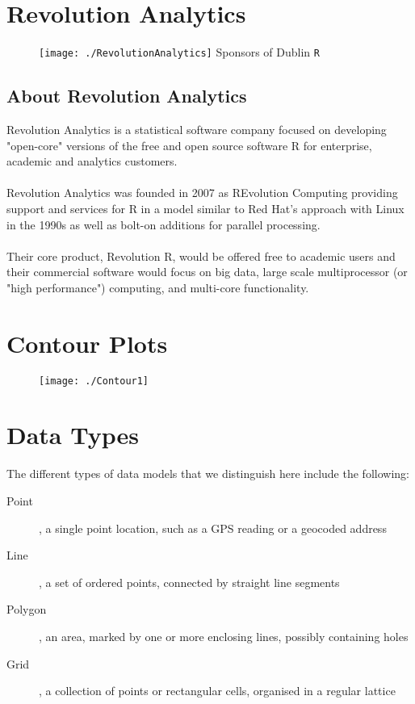 \documentclass[a4paper,12pt]{article}
\begin{document}
\tableofcontents
\newpage
\section*{Revolution Analytics}
\begin{figure}[h!]
\centering
\texttt{[image: ./RevolutionAnalytics]}
\hspace{8\baselineskip} {\Large Sponsors of Dublin \texttt{R}}
\end{figure}




\subsection*{About Revolution Analytics}
Revolution Analytics is a statistical software company focused on developing "open-core" versions of the free and open source software R for enterprise, academic and analytics customers. 
\\
\\
\noindent Revolution Analytics was founded in 2007 as REvolution Computing providing support and services for R in a model similar to Red Hat's approach with Linux in the 1990s as well as bolt-on additions for parallel processing. 
\\
\\
\noindent Their core product, Revolution R, would be offered free to academic users and their commercial software would focus on big data, large scale multiprocessor (or "high performance") computing, and multi-core functionality.
\newpage
\section{Contour Plots}
\begin{figure}[h]
\centering
\texttt{[image: ./Contour1]}
\caption{}
\label{fig:Contour1}
\end{figure}

\newpage
\section{Data Types}
The different types
of data models that we distinguish here include the following:
\begin{description}
\item[Point], a single point location, such as a GPS reading or a geocoded address
\item[Line], a set of ordered points, connected by straight line segments
\item[Polygon], an area, marked by one or more enclosing lines, possibly containing
holes
\item[Grid], a collection of points or rectangular cells, organised in a regular lattice
\end{description}
\end{document}
